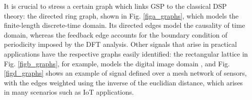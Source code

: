 It is crucial to stress a certain graph which links GSP to the classical DSP theory: the directed ring graph, shown in Fig. \ref{figa_graphs}, which models the finite-length discrete-time domain. Its directed edges model the causality of time domain, whereas the feedback edge accounts for the boundary condition of periodicity imposed by the DFT analysis. Other signals that arise in practical applications have the respective graphs easily identified: the rectangular lattice in Fig. \ref{figb_graphs}, for example, models the digital image domain \cite{sandryhaila2012nearest}, and Fig. \ref{figd_graphs} shows an example of signal defined over a mesh network of sensors, with the edges weighted using the inverse of the euclidian distance, which arises in many scenarios such as IoT applications.

\begin{figure}
	\centering
	\begin{minipage}[c]{0.24\linewidth}
	\end{minipage} %
	\begin{minipage}[c]{0.24\linewidth}
\end{minipage}
\end{figure}
